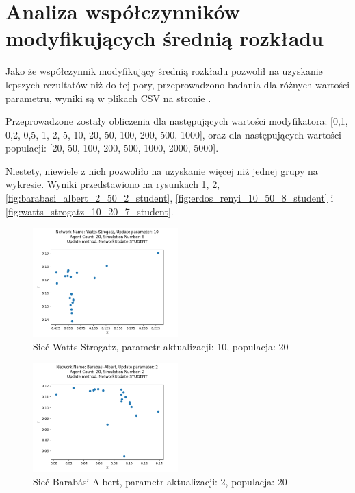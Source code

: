 \section{Analiza współczynników modyfikujących \newline średnią rozkładu}

Jako że współczynnik modyfikujący średnią rozkładu pozwolił na uzyskanie lepszych rezultatów niż do tej pory,
przeprowadzono badania dla różnych wartości parametru, wyniki są w plikach CSV na stronie \cite{research_results}.

Przeprowadzone zostały obliczenia dla następujących wartości modyfikatora: [0,1, 0,2, 0,5, 1, 2, 5, 10, 20, 50, 100, 200, 500, 1000],
oraz dla następujących wartości populacji: [20, 50, 100, 200, 500, 1000, 2000, 5000].

Niestety, niewiele z nich pozwoliło na uzyskanie więcej niż jednej grupy na wykresie. Wyniki przedstawiono na rysunkach
\ref{fig:watts_strogatz_10_20_8_student}, \ref{fig:barabasi_albert_2_20_2_student}, \ref{fig:barabasi_albert_2_50_2_student},
\ref{fig:erdos_renyi_10_50_8_student} i \ref{fig:watts_strogatz_10_20_7_student}.

\begin{figure}
    \centering
    \includegraphics[width=0.5\textwidth]{img/watts_strogatz_10_20_8_student.png}
    \caption{Sieć Watts-Strogatz, parametr aktualizacji: 10, populacja: 20}
    \label{fig:watts_strogatz_10_20_8_student}
\end{figure}

\begin{figure}
    \centering
    \includegraphics[width=0.5\textwidth]{img/barabasi_albert_2_20_2_student.png}
    \caption{Sieć Barabási-Albert, parametr aktualizacji: 2, populacja: 20}
    \label{fig:barabasi_albert_2_20_2_student}
\end{figure}


